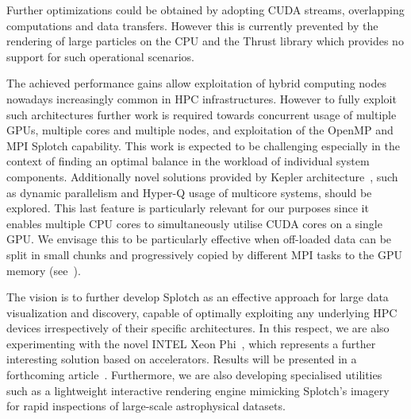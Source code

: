 \documentclass[preprint,5pt]{elsarticle}
\begin{document}
Further optimizations could be obtained by adopting CUDA streams, overlapping computations and data transfers. However this is currently prevented by the rendering of large particles on the CPU and the Thrust library which provides no support for such operational scenarios.

The achieved performance gains allow exploitation of hybrid computing nodes nowadays increasingly common in HPC infrastructures. However to fully exploit such architectures further work is required towards concurrent usage of multiple GPUs, multiple cores and multiple nodes, and exploitation of the OpenMP and MPI Splotch capability. This work is expected to be challenging especially in the context of finding an optimal balance in the workload of individual system components. Additionally novel solutions provided by Kepler architecture~\cite{GK110}, such as dynamic parallelism and Hyper-Q usage of multicore systems, should be explored. This last feature is particularly relevant for our purposes since it enables multiple CPU cores to simultaneously utilise CUDA cores on a single GPU. We envisage this to be particularly effective when off-loaded data can be split in small chunks and progressively copied by different MPI tasks to the GPU memory (see~\cite{GPUTech}). 

The vision is to further develop Splotch as an effective approach for large data visualization and discovery, capable of optimally exploiting any underlying HPC devices irrespectively of their specific architectures. In this respect, we are also experimenting with the novel INTEL Xeon Phi~\cite{mic}, which represents a further interesting solution based on accelerators. Results will be presented in a forthcoming article~\cite{mic-splotch}.
Furthermore, we are also developing specialised utilities such as a lightweight interactive rendering engine mimicking Splotch's imagery for rapid inspections of large-scale astrophysical datasets.


	
\end{document}
